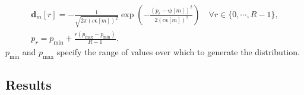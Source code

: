 \begin{subequations}
    \begin{gather}
        \symbf{d}_m\left[ r \right] = -\frac{1}{\sqrt{2 \pi (c \symbf{\epsilon}[m])^2}}
        \exp\left(
            - \frac{\left(p_r - \symbf{\psi}[m]\right)^2}{2 (c \symbf{\epsilon}[m])^2}
        \right)\quad \forall r \in \lbrace 0, \cdots, R-1 \rbrace,\\
        p_r = p_{\text{min}} + \frac{r (p_{\text{max}} - p_{\text{min}})}{R-1}.
    \end{gather}
    \label{eq:distribution}
\end{subequations}
$p_{\text{min}}$ and $p_{\text{max}}$ specify the range of values over which to
generate the distribution.

\subsection{Results}

